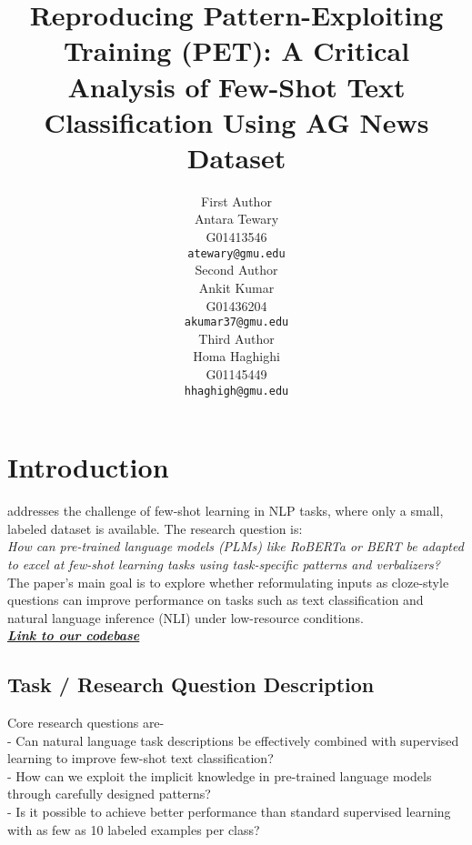 \documentclass[11pt,a4paper]{article}
\title{Reproducing Pattern-Exploiting Training (PET): A Critical Analysis of Few-Shot Text Classification Using AG News Dataset}
\author{First Author \\
  Antara Tewary\\ 
  G01413546\\
  \texttt{atewary@gmu.edu} \\\And
  Second Author \\
  Ankit Kumar\\ 
  G01436204\\
  \texttt{akumar37@gmu.edu}\\\And
  Third Author \\
  Homa Haghighi\\ 
  G01145449\\
  \texttt{hhaghigh@gmu.edu}}
\date{}
\begin{document}
\maketitle

\section{Introduction}

\citet{schick2021exploitingclozequestionsshot} addresses the challenge of few-shot learning in NLP tasks, where only a small, labeled dataset is available. The research question is:\\
\textit{How can pre-trained language models (PLMs) like RoBERTa or BERT be adapted to excel at few-shot learning tasks using task-specific patterns and verbalizers? }\\
The paper's main goal is to explore whether reformulating inputs as cloze-style questions can improve performance on tasks such as text classification and natural language inference (NLI) under low-resource conditions. \\
\href{https://github.com/StringAna/PET_Reproducibility_Study}{\textit{\textbf{Link to our codebase}}}~\cite{pet_reproduction2024}\\
            \subsection{Task / Research Question Description} 
            Core research questions are-\\
            - Can natural language task descriptions be effectively combined with supervised learning to improve few-shot text classification?\\
            - How can we exploit the implicit knowledge in pre-trained language models through carefully designed patterns?\\
            - Is it possible to achieve better performance than standard supervised learning with as few as 10 labeled examples per class?
\end{document}
